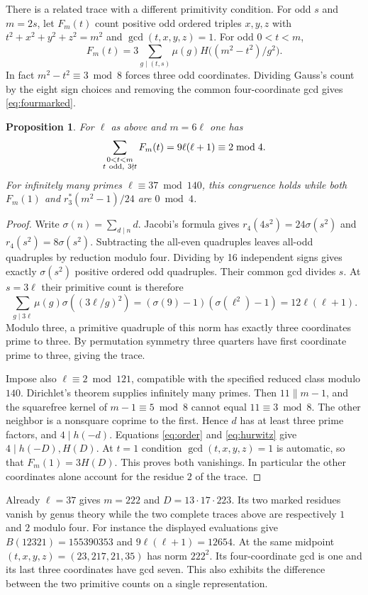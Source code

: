 \documentclass[11pt]{article}
\newtheorem{proposition}[theorem]{Proposition}
\begin{document}
There is a related trace with a different primitivity condition.
For odd $s$ and $m=2s$, let $F_m(t)$ count positive odd ordered
triples $x,y,z$ with $t^2+x^2+y^2+z^2=m^2$ and
$\gcd(t,x,y,z)=1$. For odd $0<t<m$,
\begin{equation}\label{eq:fourmarked}
 F_m(t)=3\sum_{g\mid(t,s)}\mu(g)
            H\bigl((m^2-t^2)/g^2\bigr).
\end{equation}
In fact $m^2-t^2\equiv3\bmod8$ forces three odd coordinates.
Dividing Gauss's count by the eight sign choices and removing
the common four-coordinate gcd gives \eqref{eq:fourmarked}.

\begin{proposition}\label{prop:trace}
For $\ell$ as above and $m=6\ell$ one has
\[
   \sum_{\substack{0<t<m\\t\ {\rm odd},\ 3\nmid t}}F_m(t)
        =9\ell(\ell+1)\equiv2\bmod4 .
\]
For infinitely many primes $\ell\equiv37\bmod140$, this congruence
holds while both $F_m(1)$ and $r_3^*(m^2-1)/24$ are $0\bmod4$.
\end{proposition}
\begin{proof}
Write $\sigma(n)=\sum_{d\mid n}d$. Jacobi's formula
\cite{jacobi} gives $r_4(4s^2)=24\sigma(s^2)$ and
$r_4(s^2)=8\sigma(s^2)$. Subtracting the all-even quadruples
leaves all-odd quadruples by reduction modulo four. Dividing by
16 independent signs gives exactly $\sigma(s^2)$ positive ordered
odd quadruples. Their common gcd divides $s$. At $s=3\ell$ their
primitive count is therefore
\[
 \sum_{g\mid3\ell}\mu(g)\sigma((3\ell/g)^2)
  =(\sigma(9)-1)(\sigma(\ell^2)-1)=12\ell(\ell+1).
\]
Modulo three, a primitive quadruple of this norm has exactly three
coordinates prime to three. By permutation symmetry three quarters
have first coordinate prime to three, giving the trace.

Impose also $\ell\equiv2\bmod121$, compatible with the specified
reduced class modulo $140$. Dirichlet's theorem supplies infinitely
many primes. Then $11\parallel m-1$, and the squarefree kernel of
$m-1\equiv5\bmod8$ cannot equal $11\equiv3\bmod8$. The other
neighbor is a nonsquare coprime to the first. Hence $d$ has at
least three prime factors, and $4\mid h(-d)$. Equations
\eqref{eq:order} and \eqref{eq:hurwitz} give $4\mid h(-D),H(D)$.
At $t=1$ condition $\gcd(t,x,y,z)=1$ is automatic, so that
$F_m(1)=3H(D)$. This proves both vanishings. In particular the
other coordinates alone account for the residue $2$ of the trace.
\end{proof}
Already $\ell=37$ gives $m=222$ and $D=13\cdot17\cdot223$.
Its two marked residues vanish by genus theory while the two
complete traces above are respectively $1$ and $2$ modulo four.
For instance the displayed evaluations give
$B(12321)=155390353$ and $9\ell(\ell+1)=12654$.
At the same midpoint $(t,x,y,z)=(23,217,21,35)$ has norm $222^2$.
Its four-coordinate gcd is one and its last three coordinates
have gcd seven. This also exhibits the difference between the two
primitive counts on a single representation.
\end{document}
